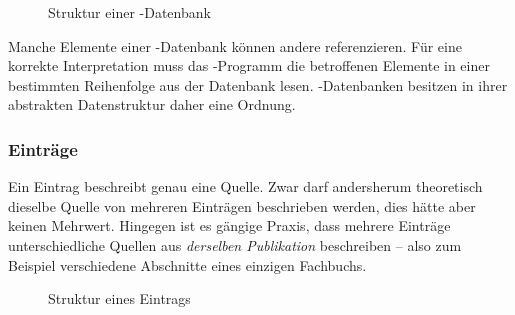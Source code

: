 \begin{figure}
    \centering
    \caption{Struktur einer \mbox{\BibTeX-}Datenbank}
    \label{fig:structure-BibTeXDatabase}
\end{figure}

Manche Elemente einer \mbox{\BibTeX-}Datenbank können andere referenzieren.
Für eine korrekte Interpretation muss das \mbox{\BibTeX-}Programm die
betroffenen Elemente in einer bestimmten Reihenfolge aus der Datenbank lesen.
\mbox{\BibTeX-}Datenbanken besitzen in ihrer abstrakten Datenstruktur daher eine
Ordnung.

\subsubsection{Einträge}

Ein Eintrag beschreibt genau eine Quelle. Zwar darf andersherum theoretisch
dieselbe Quelle von mehreren Einträgen beschrieben werden, dies hätte aber keinen Mehrwert. Hingegen ist es gängige Praxis, dass mehrere Einträge unterschiedliche Quellen aus
\emph{derselben Publikation} beschreiben -- also zum Beispiel verschiedene
Abschnitte eines einzigen Fachbuchs.

\begin{figure}
    \centering
    \caption{Struktur eines Eintrags}
    \label{fig:structure-entry}
\end{figure}

